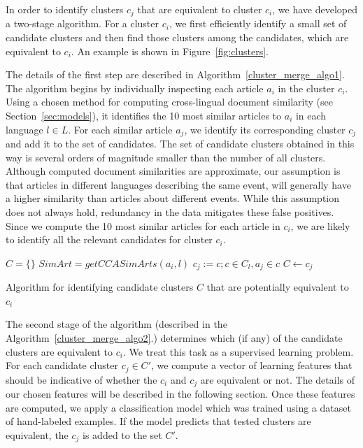 \documentclass[twoside,11pt]{article}
\begin{document}
In order to identify clusters $c_j$ that are equivalent to cluster $c_i$, we have developed a two-stage algorithm. For a cluster $c_i$, we first efficiently identify a small set of candidate clusters and then find those clusters among the candidates, which are equivalent to $c_i$. An example is  shown in  Figure~\ref{fig:clusters}.

The details of the first step are described in Algorithm~\ref{cluster_merge_algo1}. The algorithm begins by individually inspecting each article $a_i$ in the cluster $c_i$. Using a chosen method for computing cross-lingual document similarity (see Section~\ref{sec:models}), it identifies the 10 most similar articles to $a_i$ in each language $l \in L$. For each  similar article $a_j$, we identify its corresponding  cluster $c_j$ and add it to the set of candidates. The set of candidate clusters obtained in this way is several orders of magnitude smaller than the number of all clusters. Although computed document similarities are approximate, our  assumption  is that articles in different languages describing the same event, will generally have a higher similarity than articles about different events. While this assumption does not always hold, redundancy in the data mitigates these false positives. Since we compute the 10 most similar articles for each article in $c_i$, we are likely to identify all the relevant candidates for cluster $c_i$.

\begin{algorithm}[t!]
$C = \{\}$\;
 {
     {
        $SimArt = getCCASimArts(a_i, l)$\;
         {
            $c_j := c ; c \in C_l, a_j \in c$\;
            $C \leftarrow c_j$\;
        }
    }
}
\caption{Algorithm for identifying candidate clusters $C$ that are potentially equivalent to $c_i$}
\label{cluster_merge_algo1}
\end{algorithm}

The second stage of the algorithm (described in the Algorithm~\ref{cluster_merge_algo2}.) determines which (if any) of the candidate clusters are equivalent to $c_i$. We treat this task as a supervised learning problem. For each candidate cluster $c_j \in C'$, we compute a vector of learning features that should be indicative of whether the $c_i$ and $c_j$ are equivalent or not. The details of our chosen features will be described in the following section. Once these features are computed, we apply a classification model which was trained using a  dataset  of hand-labeled examples. If the model predicts that tested clusters are equivalent, the $c_j$ is added to the set $C'$.
\end{document}
